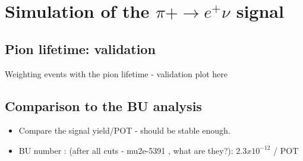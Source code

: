 \section{Simulation of the $\pi+ \to e^+ \nu $ signal }


\subsection {Pion lifetime: validation}

Weighting events with the pion lifetime - validation plot here

\begin{figure}[H]
  \caption{
    \label{fig:pion_lifetime}
  }
\end{figure}


\subsection{Comparison to the BU analysis}

{\red 
\begin{itemize}
\item 
  Compare the signal yield/POT  - should be stable enough.
\item
  BU number : (after all cuts - mu2e-5391 , what are they?): $2.3 x 10^{-12}$ / POT
\end{itemize}
}

